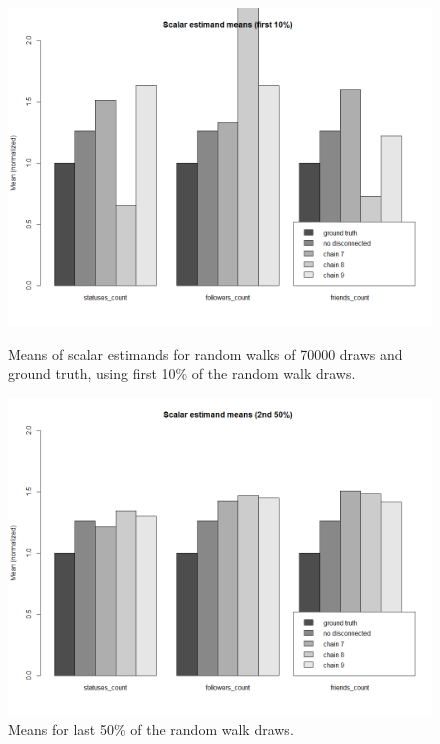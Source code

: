 \begin{figure}[htb]
      \includegraphics[width=\linewidth]{figs/scalar_estimands_means_10pct.png}
      \caption{Means of scalar estimands for random walks of 70000
          draws and ground
          truth, using first 10\% of the random walk draws.}
\label{fig:means1}
    \endminipage\hfill
    \includegraphics[width=\linewidth]{figs/scalar_estimands_means.png}
    \caption{Means for last 50\% of the random walk draws.}
\label{fig:means2}
    \endminipage
\end{figure}

